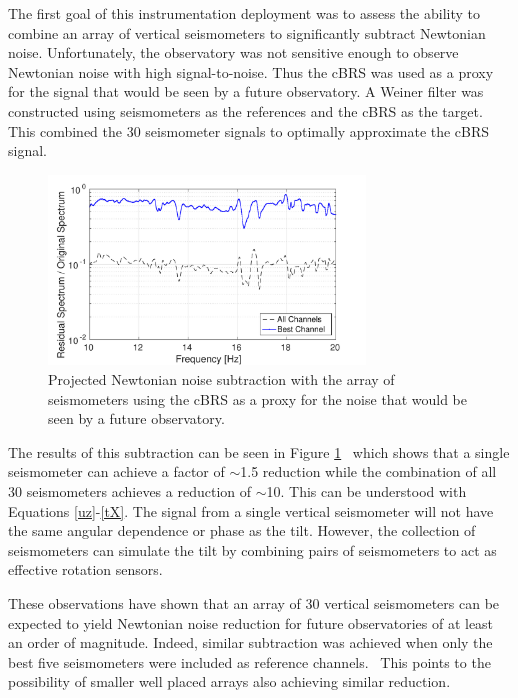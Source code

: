 \documentclass [12pt, proquest]{uwthesis}[2019]
\begin{document}
The first goal of this instrumentation deployment was to assess the ability to combine an array of vertical seismometers to significantly subtract Newtonian noise. Unfortunately, the observatory was not sensitive enough to observe Newtonian noise with high signal-to-noise. Thus the cBRS was used as a proxy for the signal that would be seen by a future observatory. A Weiner filter was constructed using seismometers as the references and the cBRS as the target. This combined the 30 seismometer signals to optimally approximate the cBRS signal.


\begin{figure}[!h]
\begin{center}
\includegraphics[width=0.75\textwidth]{NNSubtraction.pdf}
\end{center}
\caption[Projected Newtonian noise subtraction with the array of seismometers]{Projected Newtonian noise subtraction with the array of seismometers using the cBRS as a proxy for the noise that would be seen by a future observatory.}
\label{NNSub}
\end{figure}


The results of this subtraction can be seen in Figure \ref{NNSub}~\cite{NN} which shows that a single seismometer can achieve a factor of $\sim$1.5 reduction while the combination of all 30 seismometers achieves a reduction of $\sim$10. This can be understood with Equations \ref{uz}-\ref{tX}. The signal from a single vertical seismometer will not have the same angular dependence or phase as the tilt. However, the collection of seismometers can simulate the tilt by combining pairs of seismometers to act as effective rotation sensors.

These observations have shown that an array of 30 vertical seismometers can be expected to yield Newtonian noise reduction for future observatories of at least an order of magnitude. Indeed, similar subtraction was achieved when only the best five seismometers were included as reference channels.~\cite{NN} This points to the possibility of smaller well placed arrays also achieving similar reduction.
\end{document}
